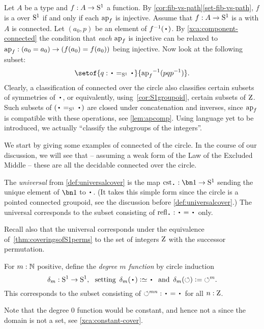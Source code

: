 Let $A$ be a type and $f:A\to {\mathrm{S}^1}$ a function.
By \cref{cor:fib-vs-path}\ref{set-fib-vs-path}, $f$ is a \covering
over ${\mathrm{S}^1}$ if and only if each $\ap{f}$ is injective.
Assume that $f:A\to {\mathrm{S}^1}$ is a \covering with $A$ is connected.
Let $(a_0,p)$ be an element of $f^{-1}(\base)$.
By \cref{xca:component-connected}
the condition that \emph{each} $\ap{f}$ is injective
can be relaxed to $\ap{f}: (a_0=a_0)\to(f(a_0)=f(a_0))$ being injective.
Now look at the following subset:
\[
  \setof{q: \base =_\Sc \base}{{\ap{f}}^{-1}(pqp^{-1})}.
\]
Clearly, a classification of connected \coverings over the circle
also classifies certain subsets of symmetries of $\base$,
or equivalently, using~\cref{cor:S1groupoid}, certain subsets of $\mathrm{Z}$.
Such subsets of $(\base=_\Sc\base)$ are closed under concatenation and inverses,
since $\ap{f}$ is compatible with these operations,
see \cref{lem:apcomp}.
Using language yet to be introduced, we actually ``classify the subgroups of the integers''.

We start by giving some examples of connected \coverings of the circle.
In the course of our discussion, we will see that -- assuming a weak form
of the Law of the Excluded Middle -- these are all the decidable connected
\coverings over the circle.

\begin{example}\label{exa:univS1cover}
The \emph{universal} \covering from \cref{def:universalcover}
is the map $\cst\base:\bn 1\to \Sc$
sending the unique element of $\bn 1$ to $\base$.
(It takes this simple form since the circle is a pointed connected
groupoid, see the discussion before \cref{def:universalcover}.)
The universal \covering corresponds to the subset consisting
of $\refl\base : \base=\base$ only.
\end{example}
Recall also that the universal \covering corresponds under the
equivalence of~\cref{thm:coveringsofS1perms} to the set of integers $\mathrm{Z}$ with the successor permutation.
\begin{example}\label{exa:mfoldS1cover}
For $m:\mathbb{N}$ positive, define the \emph{degree $m$ function} by circle induction
\[
\dg{m}:\Sc\to \Sc, \text{~~setting~}
\dg{m}(\base)\defeq\base \text{~~and~}
\dg{m}(\Sloop)\defis{\Sloop}^m.
\]
This \covering corresponds to the subset consisting
of ${\Sloop}^{mn} : \base=\base$ for all $n:\mathrm{Z}$.
\end{example}

Note that the degree $0$ function would be constant,
and hence not a \covering since the domain is not a set,
see \cref{xca:constant-cover}.

